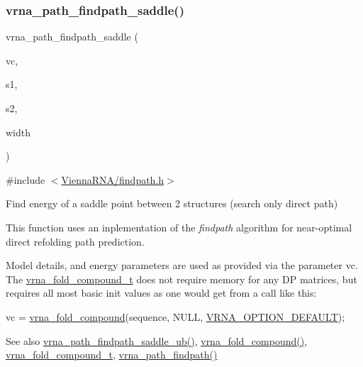\subsubsection{\texorpdfstring{vrna\+\_\+path\+\_\+findpath\+\_\+saddle()}{vrna\_path\_findpath\_saddle()}}
{\footnotesize\ttfamily vrna\+\_\+path\+\_\+findpath\+\_\+saddle (\begin{DoxyParamCaption}\item[{\mbox{\hyperlink{group__fold__compound_ga1b0cef17fd40466cef5968eaeeff6166}{vrna\+\_\+fold\+\_\+compound\+\_\+t}} $\ast$}]{vc,  }\item[{const char $\ast$}]{s1,  }\item[{const char $\ast$}]{s2,  }\item[{int}]{width }\end{DoxyParamCaption})}



{\ttfamily \#include $<$\mbox{\hyperlink{findpath_8h}{Vienna\+R\+N\+A/findpath.\+h}}$>$}



Find energy of a saddle point between 2 structures (search only direct path) 

This function uses an inplementation of the {\itshape findpath} algorithm \cite{flamm:2001} for near-\/optimal direct refolding path prediction.

Model details, and energy parameters are used as provided via the parameter \textquotesingle{}vc\textquotesingle{}. The \mbox{\hyperlink{group__fold__compound_ga1b0cef17fd40466cef5968eaeeff6166}{vrna\+\_\+fold\+\_\+compound\+\_\+t}} does not require memory for any DP matrices, but requires all most basic init values as one would get from a call like this\+: 
\begin{DoxyCode}
vc = \mbox{\hyperlink{group__fold__compound_ga6601d994ba32b11511b36f68b08403be}{vrna\_fold\_compound}}(sequence, NULL, \mbox{\hyperlink{group__fold__compound_gacea5b7ee6181c485f36e2afa0e9089e4}{VRNA\_OPTION\_DEFAULT}});
\end{DoxyCode}


\begin{DoxySeeAlso}{See also}
\mbox{\hyperlink{group__direct__paths_gada8d722e37401b1aea30128b07555771}{vrna\+\_\+path\+\_\+findpath\+\_\+saddle\+\_\+ub()}}, \mbox{\hyperlink{group__fold__compound_ga6601d994ba32b11511b36f68b08403be}{vrna\+\_\+fold\+\_\+compound()}}, \mbox{\hyperlink{group__fold__compound_ga1b0cef17fd40466cef5968eaeeff6166}{vrna\+\_\+fold\+\_\+compound\+\_\+t}}, \mbox{\hyperlink{group__direct__paths_ga4b2283c4142cafd99678495585fcc842}{vrna\+\_\+path\+\_\+findpath()}}
\end{DoxySeeAlso}

